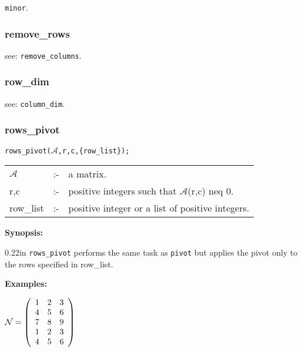 \hspace*{0.175in} {\tt minor}.


\subsubsection{remove\_rows}
\label{linalg:remove_rows}
\hspace*{0.175in} see: {\tt remove\_columns}.


\subsubsection{row\_dim}
\label{linalg:row_dim}

\hspace{0.175in} see: {\tt column\_dim}.


\subsubsection{rows\_pivot}
\label{linalg:rows_pivot}

\hspace*{0.175in} {\tt rows\_pivot($\mathcal{A}$,r,c,\{row\_list\});}

\hspace*{0.1in}  
\begin{tabular}{l l l} 
$\mathcal{A}$ &:-& a matrix. \\
r,c        &:-& positive integers such that $\mathcal{A}$(r,c) neq 0.\\
row\_list  &:-& positive integer or a list of positive integers.
\end{tabular}

{\bf Synopsis:} %

\begin{addtolength}{\leftskip}{0.22in}
{\tt rows\_pivot} performs the same task as {\tt pivot} but applies 
the pivot only to the rows specified in row\_list.

\end{addtolength}

{\bf Examples:}

\begin{flushleft}
\hspace*{0.175in}
\begin{math}  
{\cal N} = \left( \begin{array}{ccc} 1 & 2 & 3 \\ 4 & 5 & 6 \\ 7 & 8 & 
9 \\1 & 2 & 3 \\ 4 & 5 & 6
\end{array} \right)
\end{math}  
\end{flushleft}

